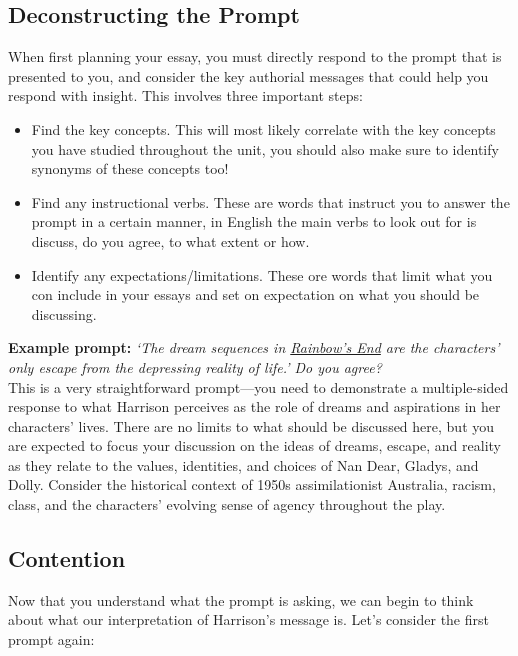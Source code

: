 \documentclass[a4paper]{article}
\begin{document}
\subsection{Deconstructing the Prompt}
When first planning your essay, you must directly respond to the prompt that is presented to you, and consider the key authorial messages that could help you respond with insight. This involves three important steps:
\begin{itemize}
    \item Find the key concepts. This will most likely correlate with the key concepts you have studied throughout the unit, you should also make sure to identify synonyms of these concepts too!
\item Find any instructional verbs. These are words that instruct you to answer the prompt in a
certain manner, in English the main verbs to look out for is discuss, do you agree, to what extent or how.
\item Identify any expectations/limitations. These ore words that limit what you con include in
your essays and set on expectation on what you should be discussing. 

\end{itemize}

\textbf{Example prompt:}
\textit{`The dream sequences in \underline{Rainbow's End} are the characters' only escape from the depressing reality of life.' Do you agree?}\\

This is a very straightforward prompt—you need to demonstrate a multiple-sided response to what Harrison perceives as the role of dreams and aspirations in her characters' lives. There are no limits to what should be discussed here, but you are expected to focus your discussion on the ideas of dreams, escape, and reality as they relate to the values, identities, and choices of Nan Dear, Gladys, and Dolly. Consider the historical context of 1950s assimilationist Australia, racism, class, and the characters' evolving sense of agency throughout the play.

\subsection{Contention}
Now that you understand what the prompt is asking, we can begin to think about what our interpretation of Harrison’s message is. Let’s consider the first prompt again:\\
\end{document}

